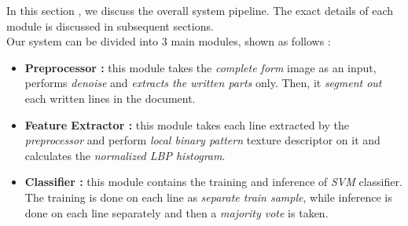 In this section , we discuss the overall system pipeline. The exact details of each module is discussed in subsequent sections. \\

Our system can be divided into $3$ main modules, shown as follows :
\begin{itemize}
    \item \textbf{Preprocessor :} this module takes the \emph{complete form} image as an input, performs \emph{denoise} and \emph{extracts the written parts} only. Then, it \emph{segment out} each written lines in the document.
    \item \textbf{Feature Extractor :} this module takes each line extracted by the \emph{preprocessor} and perform \emph{local binary pattern} texture descriptor on it and calculates the \emph{normalized LBP histogram}.
    \item \textbf{Classifier :} this module contains the training and inference of \emph{SVM} classifier. The training is done on each line as \emph{separate train sample}, while inference is done on each line separately and then a \emph{majority vote} is taken.
\end{itemize}
